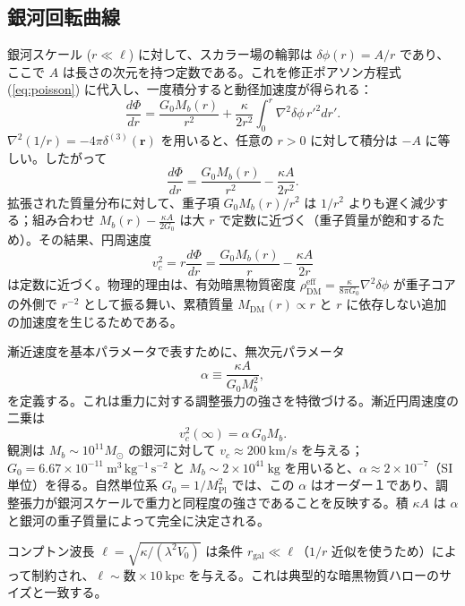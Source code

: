 \documentclass[12pt,a4paper]{article}
\begin{document}
	\subsection{銀河回転曲線}
	銀河スケール (\(r \ll \ell\)) に対して、スカラー場の輪郭は \(\delta\phi(r) = A/r\) であり、ここで \(A\) は長さの次元を持つ定数である。これを修正ポアソン方程式 (\ref{eq:poisson}) に代入し、一度積分すると動径加速度が得られる：
	\[
	\frac{d\Phi}{dr} = \frac{G_0 M_b(r)}{r^2} + \frac{\kappa}{2r^2} \int_0^r \nabla^2\delta\phi \, r'^2 dr'.
	\]
	\(\nabla^2(1/r) = -4\pi\delta^{(3)}(\mathbf{r})\) を用いると、任意の \(r>0\) に対して積分は \(-A\) に等しい。したがって
	\[
	\frac{d\Phi}{dr} = \frac{G_0 M_b(r)}{r^2} - \frac{\kappa A}{2r^2}.
	\]
	拡張された質量分布に対して、重子項 \(G_0 M_b(r)/r^2\) は \(1/r^2\) よりも遅く減少する；組み合わせ \(M_b(r) - \frac{\kappa A}{2G_0}\) は大 \(r\) で定数に近づく（重子質量が飽和するため）。その結果、円周速度
	\[
	v_c^2 = r\frac{d\Phi}{dr} = \frac{G_0 M_b(r)}{r} - \frac{\kappa A}{2r}
	\]
	は定数に近づく。物理的理由は、有効暗黒物質密度 \(\rho_{\mathrm{DM}}^{\mathrm{eff}} = \frac{\kappa}{8\pi G_0} \nabla^2\delta\phi\) が重子コアの外側で \(r^{-2}\) として振る舞い、累積質量 \(M_{\mathrm{DM}}(r) \propto r\) と \(r\) に依存しない追加の加速度を生じるためである。
	
	漸近速度を基本パラメータで表すために、無次元パラメータ
	\begin{equation}
		\alpha \equiv \frac{\kappa A}{G_0 M_b^2},
		\label{eq:alpha}
	\end{equation}
	を定義する。これは重力に対する調整張力の強さを特徴づける。漸近円周速度の二乗は
	\begin{equation}
		v_c^2(\infty) = \alpha\, G_0 M_b.
		\label{eq:vc-squared}
	\end{equation}
	観測は \(M_b \sim 10^{11}M_\odot\) の銀河に対して \(v_c \approx 200\ \mathrm{km/s}\) を与える；\(G_0 = 6.67\times 10^{-11}\ \mathrm{m^3\,kg^{-1}\,s^{-2}}\) と \(M_b \sim 2\times 10^{41}\ \mathrm{kg}\) を用いると、\(\alpha \approx 2 \times 10^{-7}\)（SI単位）を得る。自然単位系 \(G_0 = 1/M_{\mathrm{Pl}}^2\) では、この \(\alpha\) はオーダー１であり、調整張力が銀河スケールで重力と同程度の強さであることを反映する。積 \(\kappa A\) は \(\alpha\) と銀河の重子質量によって完全に決定される。
	
	コンプトン波長 \(\ell = \sqrt{\kappa/(\lambda^2 V_0)}\) は条件 \(r_{\mathrm{gal}} \ll \ell\)（\(1/r\) 近似を使うため）によって制約され、\(\ell \sim \text{数}\times 10\ \mathrm{kpc}\) を与える。これは典型的な暗黒物質ハローのサイズと一致する。
	
\end{document}
